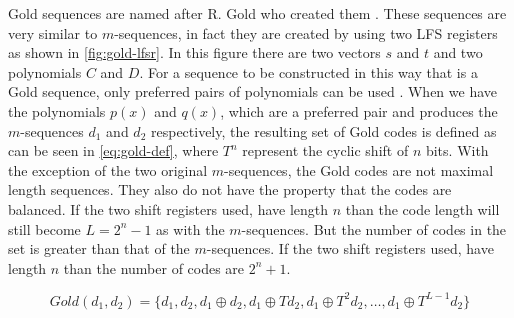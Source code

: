 		Gold sequences are named after R. Gold who created them \cite{1054106}.
		These sequences are very similar to $m$-sequences, in fact they are created by using two LFS registers as shown in \autoref{fig:gold-lfsr}.
		In this figure there are two vectors $s$ and $t$ and two polynomials $C$ and $D$.
		For a sequence to be constructed in this way that is a Gold sequence, only preferred pairs of polynomials can be used \cite{kedia2012comparative}.
		When we have the polynomials $p(x)$ and $q(x)$, which are a preferred pair and produces the $m$-sequences $d_1$ and $d_2$ respectively, the resulting set of Gold codes is defined as can be seen in \autoref{eq:gold-def}, where $T^n$ represent the cyclic shift of $n$ bits.
		With the exception of the two original $m$-sequences, the Gold codes are not maximal length sequences. 
		They also do not have the property that the codes are balanced.
		If the two shift registers used, have length $n$ than the code length will still become $L = 2^n - 1$ as with the $m$-sequences.
		But the number of codes in the set is greater than that of the $m$-sequences.
		If the two shift registers used, have length $n$ than the number of codes are $2^n + 1$.

		\begin{equation}
			\label{eq:gold-def}
			Gold(d_1, d_2) = \{ d_1, d_2, d_1 \oplus d_2, d_1 \oplus Td_2, d_1 \oplus T^2d_2, \dotsc, d_1 \oplus T^{L - 1}d_2 \}
		\end{equation}


